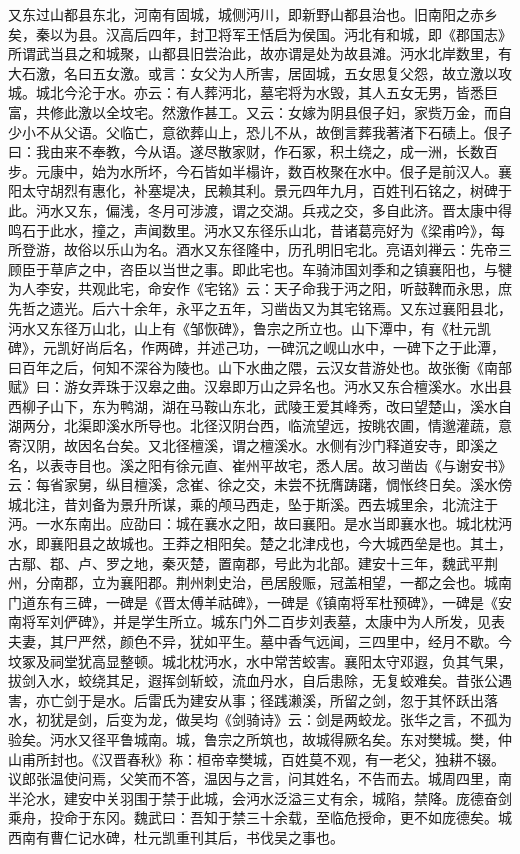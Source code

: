 \documentclass[12pt,UTF8]{ctexbook}
\begin{document}
又东过山都县东北，河南有固城，城侧沔川，即新野山都县治也。旧南阳之赤乡矣，秦以为县。汉高后四年，封卫将军王恬启为侯国。沔北有和城，即《郡国志》所谓武当县之和城聚，山都县旧尝治此，故亦谓是处为故县滩。沔水北岸数里，有大石激，名曰五女激。或言：女父为人所害，居固城，五女思复父怨，故立激以攻城。城北今沦于水。亦云：有人葬沔北，墓宅将为水毁，其人五女无男，皆悉巨富，共修此激以全坟宅。然激作甚工。又云：女嫁为阴县佷子妇，家赀万金，而自少小不从父语。父临亡，意欲葬山上，恐儿不从，故倒言葬我著渚下石碛上。佷子曰：我由来不奉教，今从语。遂尽散家财，作石冢，积土绕之，成一洲，长数百步。元康中，始为水所坏，今石皆如半榻许，数百枚聚在水中。佷子是前汉人。襄阳太守胡烈有惠化，补塞堤决，民赖其利。景元四年九月，百姓刊石铭之，树碑于此。沔水又东，偏浅，冬月可涉渡，谓之交湖。兵戎之交，多自此济。晋太康中得鸣石于此水，撞之，声闻数里。沔水又东径乐山北，昔诸葛亮好为《梁甫吟》，每所登游，故俗以乐山为名。酒水又东径隆中，历孔明旧宅北。亮语刘禅云：先帝三顾臣于草庐之中，咨臣以当世之事。即此宅也。车骑沛国刘季和之镇襄阳也，与犍为人李安，共观此宅，命安作《宅铭》云：天子命我于沔之阳，听鼓鞞而永思，庶先哲之遗光。后六十余年，永平之五年，习凿齿又为其宅铭焉。又东过襄阳县北，沔水又东径万山北，山上有《邹恢碑》，鲁宗之所立也。山下潭中，有《杜元凯碑》，元凯好尚后名，作两碑，并述己功，一碑沉之岘山水中，一碑下之于此潭，曰百年之后，何知不深谷为陵也。山下水曲之隈，云汉女昔游处也。故张衡《南部赋》曰：游女弄珠于汉皋之曲。汉皋即万山之异名也。沔水又东合檀溪水。水出县西柳子山下，东为鸭湖，湖在马鞍山东北，武陵王爱其峰秀，改曰望楚山，溪水自湖两分，北渠即溪水所导也。北径汉阴台西，临流望远，按眺农圃，情邈灌蔬，意寄汉阴，故因名台矣。又北径檀溪，谓之檀溪水。水侧有沙门释道安寺，即溪之名，以表寺目也。溪之阳有徐元直、崔州平故宅，悉人居。故习凿齿《与谢安书》云：每省家舅，纵目檀溪，念崔、徐之交，未尝不抚膺踌躇，惆怅终日矣。溪水傍城北注，昔刘备为景升所谋，乘的颅马西走，坠于斯溪。西去城里余，北流注于沔。一水东南出。应劭曰：城在襄水之阳，故曰襄阳。是水当即襄水也。城北枕沔水，即襄阳县之故城也。王莽之相阳矣。楚之北津戍也，今大城西垒是也。其土，古鄢、鄀、卢、罗之地，秦灭楚，置南郡，号此为北部。建安十三年，魏武平荆州，分南郡，立为襄阳郡。荆州刺史治，邑居殷赈，冠盖相望，一都之会也。城南门道东有三碑，一碑是《晋太傅羊祜碑》，一碑是《镇南将军杜预碑》，一碑是《安南将军刘俨碑》，并是学生所立。城东门外二百步刘表墓，太康中为人所发，见表夫妻，其尸严然，颜色不异，犹如平生。墓中香气远闻，三四里中，经月不歇。今坟冢及祠堂犹高显整顿。城北枕沔水，水中常苦蛟害。襄阳太守邓遐，负其气果，拔剑入水，蛟绕其足，遐挥剑斩蛟，流血丹水，自后患除，无复蛟难矣。昔张公遇害，亦亡剑于是水。后雷氏为建安从事；径践濑溪，所留之剑，忽于其怀跃出落水，初犹是剑，后变为龙，做吴均《剑骑诗》云：剑是两蛟龙。张华之言，不孤为验矣。沔水又径平鲁城南。城，鲁宗之所筑也，故城得厥名矣。东对樊城。樊，仲山甫所封也。《汉晋春秋》称：桓帝幸樊城，百姓莫不观，有一老父，独耕不辍。议郎张温使问焉，父笑而不答，温因与之言，问其姓名，不告而去。城周四里，南半沦水，建安中关羽围于禁于此城，会沔水泛溢三丈有余，城陷，禁降。庞德奋剑乘舟，投命于东冈。魏武曰：吾知于禁三十余载，至临危授命，更不如庞德矣。城西南有曹仁记水碑，杜元凯重刊其后，书伐吴之事也。
\end{document}
